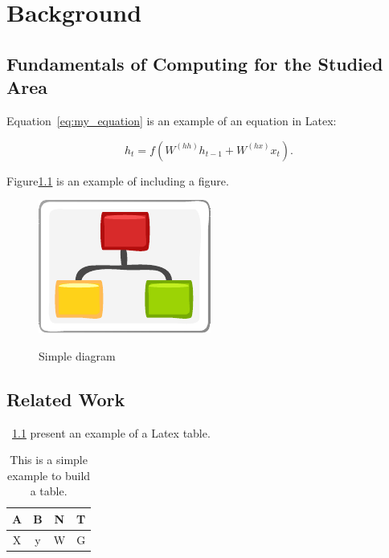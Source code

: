 
\chapter{Background}\label{chap:background}



\section{Fundamentals of Computing for the Studied Area}\label{sec:fundamental}

Equation~\ref{eq:my_equation} is an example of an equation in Latex:

\begin{equation}\label{eq:my_equation}
    h_t = f(W^{(hh)}h_{t-1} + W^{(hx)}x_t).
\end{equation}


Figure\ref{fig:diagram} is an example of including a figure.

\begin{figure}[htb]
    \caption{Simple diagram}
    \centering
    \includegraphics[scale=1.9]{img/diagram.pdf}
    \label{fig:diagram}
\end{figure}

\cite{GRIEBLER:IJPP:18}


\cite{MACCOOL:structured_patterns:book:12}


\section{Related Work}\label{sec:rw}


\tablename~\ref{tab:my_table} present an example of a Latex table.

\begin{table}[htb]
    \centering
    \begin{tabular}{|c|c|c|c|}
        \hline
         A & B & N & T\\ 
         \hline
         X & y & W & G\\
         \hline
    \end{tabular}
    \caption{This is a simple example to build a table.}
    \label{tab:my_table}
\end{table}